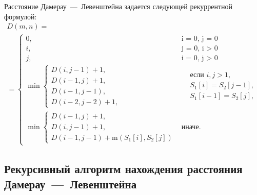 Расстояние Дамерау~---~Левенштейна задается следующей рекуррентной формулой:
\begin{multline}
    D(m, n) =\\ =
    \begin{cases}
        0, &\text{i = 0, j = 0}\\
        i, &\text{j = 0, i > 0}\\
        j, &\text{i = 0, j > 0}\\
        \min
        \begin{cases}
            D(i, j - 1) + 1,\\
            D(i - 1, j) + 1,\\
            D(i - 1, j - 1),\\
            D(i - 2, j - 2) + 1,
        \end{cases} 
        &\begin{aligned}
            & \text{если $i, j > 1$}, \\
            & S_{1}[i] = S_{2}[j - 1], \\
            & S_{1}[i - 1] = S_{2}[j],
        \end{aligned} \\
        \min
        \begin{cases}
            D(i - 1, j) + 1, \\
            D(i, j - 1) + 1, \\
            D(i - 1, j - 1) + \text{m}(S_1[i], S_2[j])
        \end{cases} &\text{иначе.}
    \end{cases}
    \label{eqn:recur-damlev}
\end{multline}

\subsection{\texorpdfstring{Рекурсивный алгоритм нахождения расстояния Дамерау~---~Левенштейна}{}}

